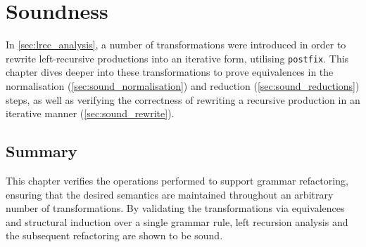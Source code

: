 \chapter{Soundness}
\label{chap:soundness}

In \autoref{sec:lrec_analysis}, a number of transformations were introduced in order to rewrite left-recursive productions into an iterative form, utilising \texttt{postfix}.
This chapter dives deeper into these transformations to prove equivalences in the normalisation (\autoref{sec:sound_normalisation}) and reduction (\autoref{sec:sound_reductions}) steps, as well as verifying the correctness of rewriting a recursive production in an iterative manner (\autoref{sec:sound_rewrite}).






\section*{Summary}
This chapter verifies the operations performed to support grammar refactoring, ensuring that the desired semantics are maintained throughout an arbitrary number of transformations.
By validating the transformations via equivalences and structural induction over a single grammar rule, left recursion analysis and the subsequent refactoring are shown to be sound.
